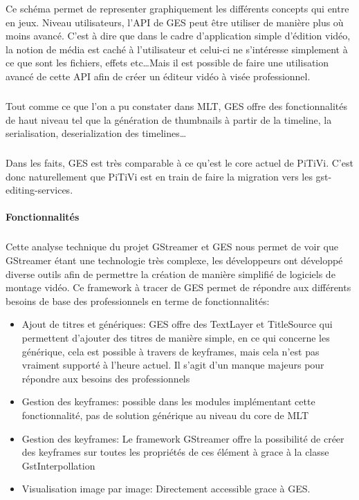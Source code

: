 Ce schéma permet de representer graphiquement les différents concepts
qui entre en jeux. Niveau utilisateurs, l'API de GES peut être
utiliser de manière plus où moins avancé. C'est à dire que dans le
cadre d'application simple d'édition vidéo, la notion de média est
caché à l'utilisateur et celui-ci ne s'intéresse simplement à ce
que sont les fichiers, effets etc\ldots Mais il est possible de faire
une utilisation avancé de cette API afin de créer un éditeur vidéo
à visée professionnel.

\subparagraph{}

Tout comme ce que l'on a pu constater dans MLT, GES
offre des fonctionnalités de haut niveau tel que la génération de
thumbnails à partir de la timeline, la serialisation, deserialization
des timelines\ldots

\subparagraph{}

Dans les faits, GES est très comparable à ce qu'est le core actuel
de PiTiVi. C'est donc naturellement que PiTiVi est en train de faire la
migration vers les gst-editing-services.

\paragraph{Fonctionnalités}

\subparagraph{ }

Cette analyse technique du projet GStreamer et GES nous permet de voir
que GStreamer étant une technologie très complexe, les développeurs
ont développé diverse outils afin de permettre la création de manière
simplifié de logiciels de montage vidéo. Ce framework à tracer de GES
permet de répondre aux différents besoins de base des professionnels
en terme de fonctionnalités:

\begin{itemize}

  \item {Ajout de titres et génériques: GES offre des TextLayer et
  TitleSource
    qui permettent d'ajouter des titres de manière simple, en ce qui
    concerne les générique, cela est possible à travers de keyframes,
    mais cela n'est pas vraiment supporté à l'heure actuel. Il s'agit
    d'un manque majeurs pour répondre aux besoins des professionnels}

  \item {Gestion des keyframes: possible dans les modules implémentant
    cette fonctionnalité, pas de solution générique au niveau du core
    de MLT}

  \item {Gestion des keyframes: Le framework GStreamer offre la
  possibilité
    de créer des keyframes sur toutes les propriétés de ces élément
    à grace à la classe GstInterpollation}

  \item {Visualisation image par image: Directement accessible grace
  à GES.}

\end{itemize}

